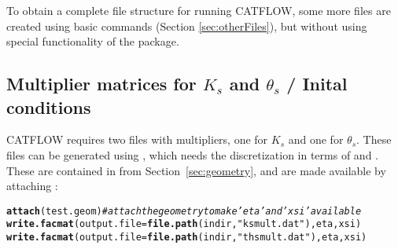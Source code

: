 \documentclass[article,nojss]{jss}\usepackage[]{graphicx}\usepackage[]{xcolor}
\makeatletter
\newcommand{\hlsng}[1]{\textcolor[rgb]{0.192,0.494,0.8}{#1}}%
\newcommand{\hlcom}[1]{\textcolor[rgb]{0.678,0.584,0.686}{\textit{#1}}}%
\newcommand{\hldef}[1]{\textcolor[rgb]{0.345,0.345,0.345}{#1}}%
\newcommand{\hlkwc}[1]{\textcolor[rgb]{0.333,0.667,0.333}{#1}}%
\newcommand{\hlkwd}[1]{\textcolor[rgb]{0.737,0.353,0.396}{\textbf{#1}}}%
\newenvironment{kframe}{%
 \def\at@end@of@kframe{}%
 \ifinner\ifhmode%
  \def\at@end@of@kframe{\end{minipage}}%
  \begin{minipage}{\columnwidth}%
 \fi\fi%
 \def\FrameCommand##1{\hskip\@totalleftmargin \hskip-\fboxsep
 \colorbox{shadecolor}{##1}\hskip-\fboxsep
     \hskip-\linewidth \hskip-\@totalleftmargin \hskip\columnwidth}%
 \MakeFramed {\advance\hsize-\width
   \@totalleftmargin\z@ \linewidth\hsize
   \@setminipage}}%
 {\par\unskip\endMakeFramed%
 \at@end@of@kframe}
\newenvironment{knitrout}{}{} %
\makeatother
\begin{document}
To obtain a complete file structure for running CATFLOW, some more files are
created using basic  commands (Section \ref{sec:otherFiles}), but without using special functionality of the  package. %

\subsection[Multiplier matrices for K_s and theta_s / Inital conditions]{Multiplier matrices for $K_s$ and $\theta_s$ / Inital conditions} 

CATFLOW requires two files with multipliers, one for $K_s$ and one for $\theta_s$. These files can be generated using , which needs the discretization in terms of  and .
These are contained in  from Section~\ref{sec:geometry}, and are made available by attaching :

\begin{knitrout}
\color{fgcolor}\begin{kframe}
\begin{alltt}
  \hlkwd{attach}\hldef{(test.geom)}   \hlcom{# attach the geometry to make 'eta' and 'xsi' available}
  \hlkwd{write.facmat}\hldef{(}\hlkwc{output.file}\hldef{=}\hlkwd{file.path}\hldef{(indir,} \hlsng{"ksmult.dat"}\hldef{), eta, xsi)}
  \hlkwd{write.facmat}\hldef{(}\hlkwc{output.file}\hldef{=}\hlkwd{file.path}\hldef{(indir,} \hlsng{"thsmult.dat"}\hldef{), eta, xsi)}
\end{alltt}
\end{kframe}
\end{knitrout}

\end{document}
